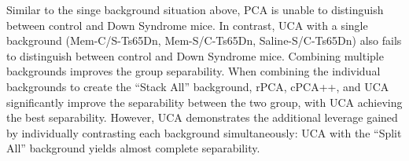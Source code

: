 \documentclass[12pt]{article}
\begin{document}
Similar to the singe background situation above, PCA is unable to distinguish between control and Down Syndrome mice.
In contrast, UCA with a single background (Mem-C/S-Ts65Dn, Mem-S/C-Ts65Dn, Saline-S/C-Ts65Dn) also fails to distinguish between control and Down Syndrome mice.
Combining multiple backgrounds improves the group separability. When combining the individual backgrounds to create the ``Stack All'' background, rPCA, cPCA++, and UCA significantly improve the separability between the two group, with UCA achieving the best separability.
However, UCA demonstrates the additional leverage gained by individually contrasting each background simultaneously: UCA with the ``Split All'' background yields almost complete separability. 




\end{document}
